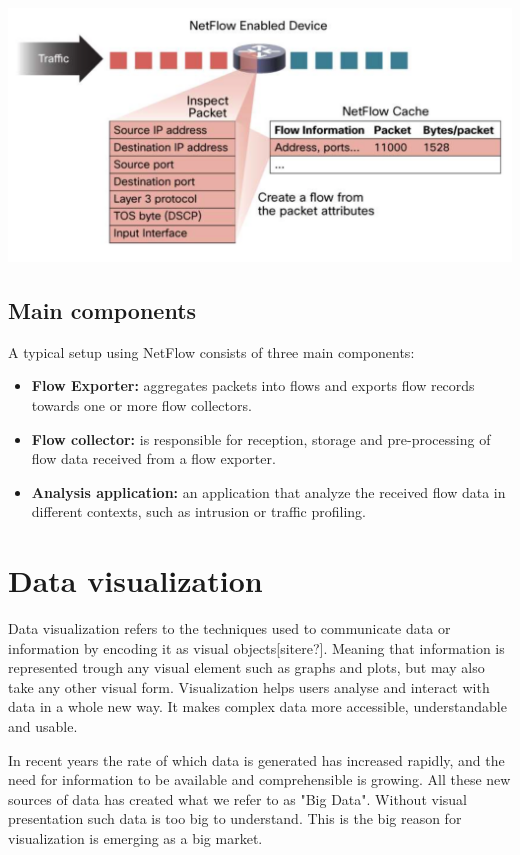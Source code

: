 
\includegraphics[scale=0.2]{netflow_cache}

\subsection{Main components}
A typical setup using NetFlow consists of three main components:

\begin{itemize}
\item \textbf{Flow Exporter:} aggregates packets into flows and exports flow records towards one or more flow collectors. 

\item \textbf{Flow collector:} is responsible for reception, storage and pre-processing of flow data received from a flow exporter.

\item \textbf{Analysis application:} an application that analyze the received flow data in different contexts, such as intrusion or traffic profiling.
\end{itemize}

\section{Data visualization}
Data visualization refers to the techniques used to communicate data or information by encoding it as visual objects[sitere?]. Meaning that information is represented trough any visual element such as graphs and plots, but may also take any other visual form. Visualization helps users analyse and interact with data in a whole new way. It makes complex data more accessible, understandable and usable. 

In recent years the rate of which data is generated has increased rapidly, and the need for information to be available and comprehensible is growing. All these new sources of data has created what we refer to as "Big Data". Without visual presentation such data is too big to understand. This is the big reason for visualization is emerging as a big market. 

